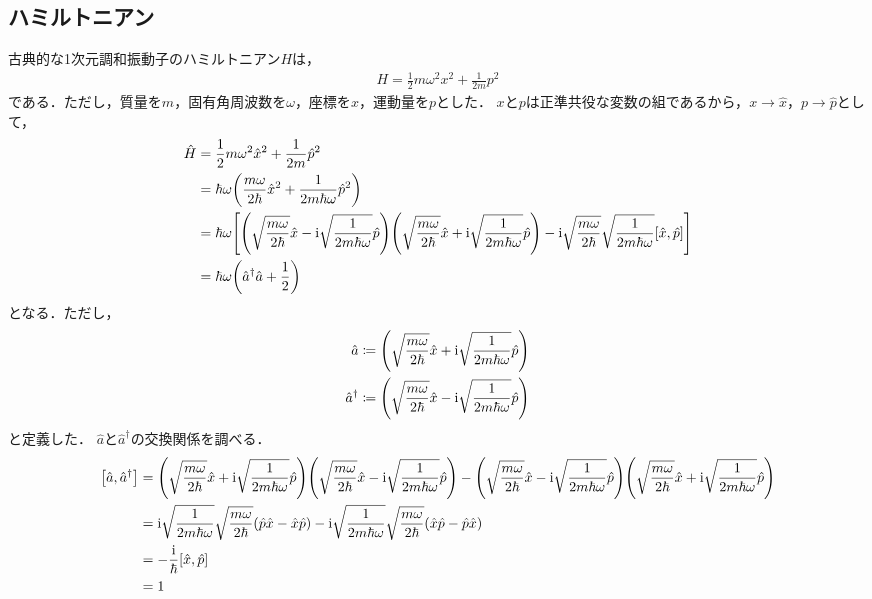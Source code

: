 \documentclass{report}
\begin{document}
  \subsection{ハミルトニアン}
    古典的な1次元調和振動子のハミルトニアン$H$は，
    \begin{align}
      H = \frac{1}{2}m\omega^2x^2 + \frac{1}{2m}p^2
    \end{align}
    である．ただし，質量を$m$，固有角周波数を$\omega$，座標を$x$，運動量を$p$とした．
    $x$と$p$は正準共役な変数の組であるから，$x\to \hat{x}$，$p \to \hat{p}$として，
    \begin{align}
      \hat{H} &= \frac{1}{2}m\omega^2\hat{x}^2 + \frac{1}{2m}\hat{p}^2 \label{harmonic-oscillator-hamiltonian}\\ 
      &= \hbar\omega\qty(\frac{m\omega}{2\hbar}\hat{x}^2 + \frac{1}{2m\hbar\omega}\hat{p}^2) \\ 
      &= \hbar\omega\qty[\qty(\sqrt{\frac{m\omega}{2\hbar}}\hat{x} - \mathrm{i}\sqrt{\frac{1}{2m\hbar\omega}}\hat{p})\qty(\sqrt{\frac{m\omega}{2\hbar}}\hat{x} + \mathrm{i}\sqrt{\frac{1}{2m\hbar\omega}}\hat{p}) - \mathrm{i}\sqrt{\frac{m\omega}{2\hbar}}\sqrt{\frac{1}{2m\hbar\omega}}\qty[\hat{x}, \hat{p}]] \\ 
      &= \hbar\omega\qty(\hat{a}^{\dag}\hat{a} + \frac{1}{2})
    \end{align}
    となる．ただし，
    \begin{align}
      \hat{a} &\coloneqq \qty(\sqrt{\frac{m\omega}{2\hbar}}\hat{x} + \mathrm{i}\sqrt{\frac{1}{2m\hbar\omega}}\hat{p}) \\ 
      \hat{a}^{\dag} &\coloneqq \qty(\sqrt{\frac{m\omega}{2\hbar}}\hat{x} - \mathrm{i}\sqrt{\frac{1}{2m\hbar\omega}}\hat{p})
    \end{align}
    と定義した．
    $\hat{a}$と$\hat{a}^{\dag}$の交換関係を調べる．
    \begin{align}
      \qty[\hat{a}, \hat{a}^{\dag}] &= \qty(\sqrt{\frac{m\omega}{2\hbar}}\hat{x} + \mathrm{i}\sqrt{\frac{1}{2m\hbar\omega}}\hat{p})\qty(\sqrt{\frac{m\omega}{2\hbar}}\hat{x} - \mathrm{i}\sqrt{\frac{1}{2m\hbar\omega}}\hat{p}) - \qty(\sqrt{\frac{m\omega}{2\hbar}}\hat{x} - \mathrm{i}\sqrt{\frac{1}{2m\hbar\omega}}\hat{p})\qty(\sqrt{\frac{m\omega}{2\hbar}}\hat{x} + \mathrm{i}\sqrt{\frac{1}{2m\hbar\omega}}\hat{p}) \\ 
      &= \mathrm{i}\sqrt{\frac{1}{2m\hbar\omega}}\sqrt{\frac{m\omega}{2\hbar}}\qty(\hat{p}\hat{x} - \hat{x}\hat{p}) -  \mathrm{i}\sqrt{\frac{1}{2m\hbar\omega}}\sqrt{\frac{m\omega}{2\hbar}}\qty(\hat{x}\hat{p} - \hat{p}\hat{x}) \\ 
      &= -\frac{\mathrm{i}}{\hbar}\qty[\hat{x}, \hat{p}] \\ 
      &= 1
    \end{align}
\end{document}
